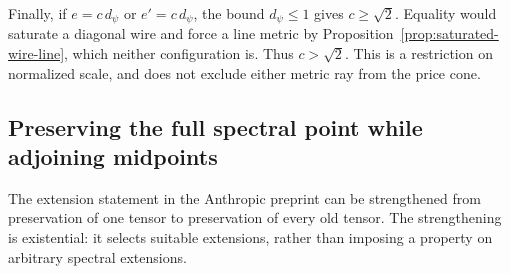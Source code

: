 Finally, if $e=c\,d_\psi$ or $e'=c\,d_\psi$, the bound $d_\psi\leq1$ gives $c\geq\sqrt2$.  Equality would saturate a diagonal wire and force a line metric by Proposition~\ref{prop:saturated-wire-line}, which neither configuration is.  Thus $c>\sqrt2$.  This is a restriction on normalized scale, and does not exclude either metric ray from the price cone.

\subsection{Preserving the full spectral point while adjoining midpoints}
The extension statement in the Anthropic preprint can be strengthened from preservation of one tensor to preservation of every old tensor.  The strengthening is existential: it selects suitable extensions, rather than imposing a property on arbitrary spectral extensions.

